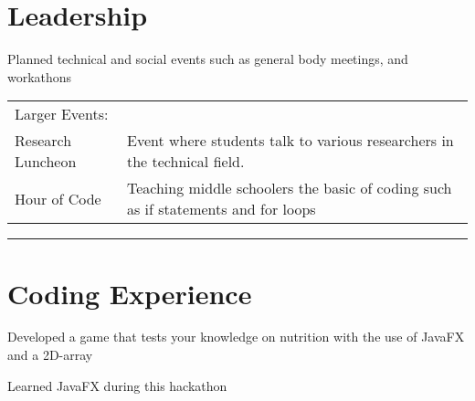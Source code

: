 \documentclass[]{deedy-resume-openfont}
\begin{document}
\section{Leadership}

\begin{tightemize}
\item Planned technical and social events such as general body meetings, and workathons
\begin{tabular}{ll}
Larger Events: & \\
\hspace{0.1 in}Research Luncheon & Event where students talk to various researchers in the technical field.\\
\hspace{0.1 in}Hour of Code & Teaching middle schoolers the basic of coding such as if statements and for loops\\
\end{tabular}
\end{tightemize}
\sectionsep

\noindent\rule{\textwidth}{0.4pt}
\section{Coding Experience}

\begin{tightemize}
\item Developed a game that tests your knowledge on nutrition with the use of JavaFX and a 2D-array
\item  Learned JavaFX during this hackathon
\end{tightemize}
\sectionsep

\end{document}
